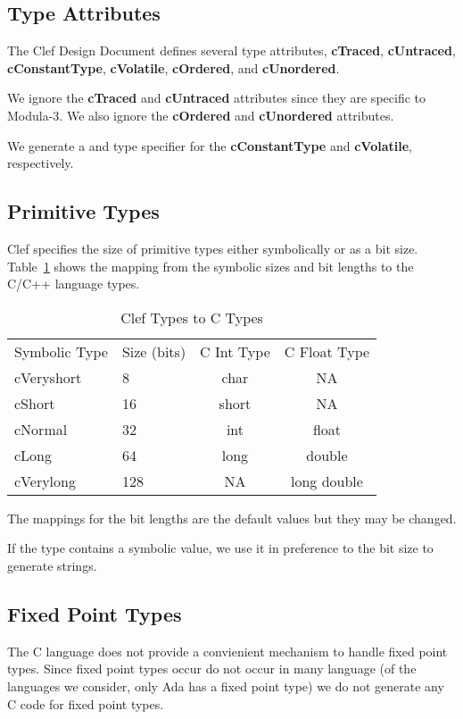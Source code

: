 \subsection{Type Attributes}

The Clef Design Document defines several type attributes,
\textbf{cTraced}, \textbf{cUntraced}, \textbf{cConstantType}, 
\textbf{cVolatile}, \textbf{cOrdered}, and \textbf{cUnordered}.

We ignore the \textbf{cTraced} and \textbf{cUntraced} attributes since
they are specific to Modula-3.  We also ignore the \textbf{cOrdered}
and \textbf{cUnordered} attributes.

We generate a  and  type specifier for the 
\textbf{cConstantType} and \textbf{cVolatile}, respectively.

\subsection{Primitive Types}

Clef specifies the size of primitive types either symbolically
or as a bit size.  Table~\ref{primtypes} shows the mapping
from the symbolic sizes and bit lengths to the C/C++ language
types.
\begin{table}[h]
\begin{center}
\begin{tabular}{llcc}
Symbolic Type & Size (bits) & C Int Type & C Float Type \\
cVeryshort & 8 & char & NA \\
cShort & 16 & short & NA \\
cNormal & 32 & int & float \\
cLong & 64 & long & double \\
cVerylong & 128 & NA & long double \\
\end{tabular}
\end{center}
\caption{Clef Types to C Types}
\label{primtypes}
\end{table}
The mappings for the bit lengths are the default values but they may
be changed.

If the type contains a symbolic value, we use it in preference to the
bit size to generate strings.

\subsection{Fixed Point Types}

The C language does not provide a convienient mechanism to handle
fixed point types.  Since fixed point types occur do not occur in many
language (of the languages we consider, only Ada has a fixed point
type) we do not generate any C code for fixed point types.

